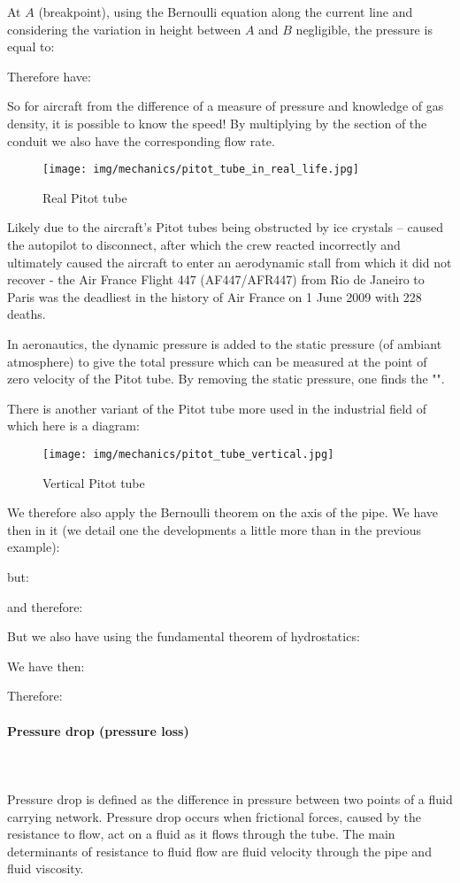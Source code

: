 	At $A$ (breakpoint), using the Bernoulli equation along the current line and considering the variation in height between $A$ and $B$ negligible, the pressure is equal to:
	
	Therefore have:
	
	So for aircraft from the difference of a measure of pressure and knowledge of gas density, it is possible to know the speed! By multiplying by the section of the conduit we also have the corresponding flow rate.
	\begin{figure}[H]
		\centering
		\texttt{[image: img/mechanics/pitot\_tube\_in\_real\_life.jpg]}
		\caption{Real Pitot tube}
	\end{figure}
	 Likely due to the aircraft's Pitot tubes being obstructed by ice crystals – caused the autopilot to disconnect, after which the crew reacted incorrectly and ultimately caused the aircraft to enter an aerodynamic stall from which it did not recover - the Air France Flight 447 (AF447/AFR447) from Rio de Janeiro to Paris was the deadliest in the history of Air France on 1 June 2009 with 228 deaths.
	\begin{tcolorbox}[title=Remark,colframe=black,arc=10pt]
	In aeronautics, the dynamic pressure is added to the static pressure (of ambiant atmosphere) to give the total pressure which can be measured at the point of zero velocity of the Pitot tube. By removing the static pressure, one finds the "".
	\end{tcolorbox}
	There is another variant of the Pitot tube more used in the industrial field of which here is a diagram:
	\begin{figure}[H]
		\centering
		\texttt{[image: img/mechanics/pitot\_tube\_vertical.jpg]}
		\caption{Vertical Pitot tube}
	\end{figure}
	We therefore also apply the Bernoulli theorem on the axis of the pipe. We have then in it (we detail one the developments a little more than in the previous example):
	
	but:
	
	 and therefore:
	
	But we also have using the fundamental theorem of hydrostatics:
	
	We have then:
	
	Therefore:
	
	
	\paragraph{Pressure drop (pressure loss)}\mbox{}\\\\
	Pressure drop is defined as the difference in pressure between two points of a fluid carrying network. Pressure drop occurs when frictional forces, caused by the resistance to flow, act on a fluid as it flows through the tube. The main determinants of resistance to fluid flow are fluid velocity through the pipe and fluid viscosity.

